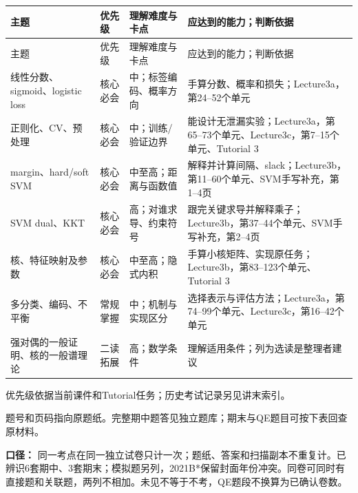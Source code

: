 \begingroup
\small\setlength{\tabcolsep}{3pt}
\renewcommand{\arraystretch}{1.22}
\begin{longtable}{@{}>{\raggedright\arraybackslash}p{}>{\raggedright\arraybackslash}p{}>{\raggedright\arraybackslash}p{}>{\raggedright\arraybackslash}p{}@{}}
\toprule
主题 & 优先级 & 理解难度与卡点 & 应达到的能力；判断依据 \\
\midrule\endfirsthead
主题 & 优先级 & 理解难度与卡点 & 应达到的能力；判断依据 \\
\midrule\endhead
\bottomrule\endfoot
线性分数、sigmoid、logistic loss & 核心必会 & 中；标签编码、概率方向 & 手算分数、概率和损失；Lecture3a，第24–52个单元 \\
正则化、CV、预处理 & 核心必会 & 中；训练/验证边界 & 能设计无泄漏实验；Lecture3a，第65–73个单元、Lecture3c，第7–15个单元、Tutorial 3 \\
margin、hard/soft SVM & 核心必会 & 中至高；距离与函数值 & 解释并计算间隔、slack；Lecture3b，第11–60个单元、SVM手写补充，第1–4页 \\
SVM dual、KKT & 核心必会 & 高；对谁求导、约束符号 & 跟完关键求导并解释乘子；Lecture3b，第37–44个单元、SVM手写补充，第2–4页 \\
核、特征映射及参数 & 核心必会 & 中至高；隐式内积 & 手算小核矩阵、实现原任务；Lecture3b，第83–123个单元、Tutorial 3 \\
多分类、编码、不平衡 & 常规掌握 & 中；机制与实现区分 & 选择表示与评估方法；Lecture3a，第74–99个单元、Lecture3c，第16–42个单元 \\
强对偶的一般证明、核的一般谱理论 & 二读拓展 & 高；数学条件 & 理解适用条件；列为选读是整理者建议 \\
\end{longtable}
\endgroup

优先级依据当前课件和Tutorial任务；历史考试记录另见讲末索引。



题号和页码指向原题纸。完整期中题答见独立题库；期末与QE题目可按下表回查原材料。




\textbf{口径：} 同一考点在同一独立试卷只计一次；题纸、答案和扫描副本不重复计。已辨识6套期中、3套期末；模拟题另列，2021B*保留封面年份冲突。同卷可同时有直接题和关联题，两列不相加。未见不等于不考，QE题段不换算为已确认卷数。


